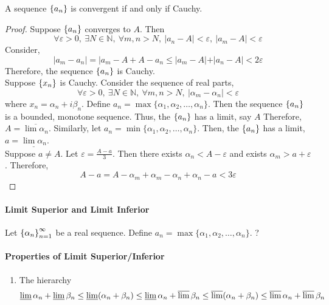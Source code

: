 \begin{theorem}
	A sequence $\left\{a_n\right\}$ is convergent if and only if Cauchy.
\end{theorem}
\begin{proof}
	Suppose $\left\{a_n\right\}$ converges to $A$.
	Then \[\forall \varepsilon > 0,\ \exists N \in \mathbb{N},\ \forall m,n > N,\ |a_n - A| < \varepsilon,\ |a_m - A| < \varepsilon \]
	Consider,
	\[ |a_m - a_n| = |a_m - A + A - a_n \le |a_m - A| + |a_n - A| < 2\varepsilon \]
	Therefore, the sequence $\left\{a_n\right\}$ is Cauchy.\\

	Suppose $\left\{x_n\right\}$ is Cauchy.
	Consider the sequence of real parts,
	\[\forall \varepsilon > 0,\ \exists N \in \mathbb{N},\ \forall m,n > N,\ |\alpha_m-\alpha_n| < \varepsilon \]
	where $x_n = \alpha_n + i \beta_n$.
	Define $a_n = \max\{\alpha_1, \alpha_2, \dots, \alpha_n\}$.
	Then the sequence $\left\{a_n\right\}$ is a bounded, monotone sequence.
	Thus, the $\left\{a_n\right\}$ has a limit, say $A$
	Therefore, $A = \overline{\lim \alpha_n}$.
	Similarly, let $a_n = \min\{\alpha_1,\alpha_2,\dots,\alpha_n\}$.
	Then, the $\left\{a_n\right\}$ has a limit, $a = \underline{\lim \alpha_n}$. \\
	
	Suppose $a \ne A$.
	Let $\varepsilon = \frac{A-a}{3}$.
	Then there exists $\alpha_n < A-\varepsilon$ and exists $\alpha_m > a + \varepsilon$.
	Therefore, \[A-a = A - \alpha_m + \alpha_m - \alpha_n + \alpha_n - a < 3\varepsilon \]
\end{proof}

\paragraph{Limit Superior and Limit Inferior}
\begin{definition}
	Let $\left\{\alpha_n\right\}_{n=1}^\infty$ be a real sequence.
	Define $a_n = \max\{\alpha_1,\alpha_2,\dots,\alpha_n\}$.
	?
\end{definition}
\paragraph{Properties of Limit Superior/Inferior}
\begin{enumerate}
	\item The hierarchy
	\[ \varliminf \alpha_n + \varliminf \beta_n \le \varliminf (\alpha_n+\beta_n) \le \varliminf \alpha_n + \varlimsup \beta_n \le \varlimsup (\alpha_n + \beta_n) \le \varlimsup \alpha_n + \varlimsup \beta_n \]
\end{enumerate}

